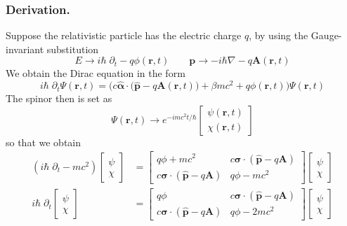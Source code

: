 \documentclass[../../../main.tex]{subfiles}
\begin{document}
\subsubsection{Derivation.}
Suppose the relativistic particle has the electric charge $q$, by using the Gauge-invariant substitution
\begin{equation*}
    E \to i\hbar\;\partial_t-q\phi(\mathbf r,t)  \qquad \mathbf{p} \to -i\hbar\nabla - q\mathbf{A}(\mathbf r,t)
\end{equation*}
We obtain the Dirac equation in the form
\begin{equation*}
    i\hbar\;\partial_t\Psi(\mathbf r,t) =
    \Big(c\hat{\boldsymbol\alpha}\cdot\big(\hat{\mathbf p}-q\mathbf{A}(\mathbf r,t)\big)+\beta mc^2+q\phi(\mathbf r,t)\Big)\Psi(\mathbf{ r},t)
\end{equation*}
The spinor then is set as
\begin{equation*}
    \Psi(\mathbf r,t)
    \to e^{-imc^2t/\hbar}
    \begin{bmatrix}
        \psi(\mathbf r,t) \\
        \chi(\mathbf r,t)
    \end{bmatrix}
\end{equation*}
so that we obtain
\begin{align*}
    (    i\hbar \; \partial_t- mc^2)
    \begin{bmatrix}
        \psi \\
        \chi
    \end{bmatrix}
     & =
    \begin{bmatrix}
        q\phi+mc^2                                             & c\boldsymbol{\sigma}\cdot(\hat{\mathbf p}-q\mathbf{A}) \\
        c\boldsymbol{\sigma}\cdot(\hat{\mathbf p}-q\mathbf{A}) & q\phi-mc^2
    \end{bmatrix}
    \begin{bmatrix}
        \psi \\
        \chi
    \end{bmatrix}
    \\
    i\hbar \; \partial_t
    \begin{bmatrix}
        \psi \\
        \chi
    \end{bmatrix}
     & =
    \begin{bmatrix}
        q\phi                                                  & c\boldsymbol{\sigma}\cdot(\hat{\mathbf p}-q\mathbf{A}) \\
        c\boldsymbol{\sigma}\cdot(\hat{\mathbf p}-q\mathbf{A}) & q\phi-2mc^2
    \end{bmatrix}
    \begin{bmatrix}
        \psi \\
        \chi
    \end{bmatrix}
\end{align*}
\end{document}
